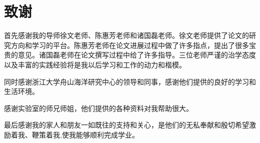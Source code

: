 \renewcommand{\baselinestretch}{1.5}
\fontsize{12pt}{13pt}\selectfont
{}
\chapter*{致谢}
首先感谢我的导师徐文老师、陈惠芳老师和诸国磊老师。徐文老师提供了论文的研究方向和学习的平台。陈惠芳老师在论文进展过程中做了许多指点，提出了很多宝贵的意见。诸国磊老师在论文撰写过程中给了许多指导。三位老师严谨的治学态度以及丰富的实践经验将是我以后学习和工作的动力和楷模。

同时感谢浙江大学舟山海洋研究中心的领导和同事，感谢他们提供的良好的学习和生活环境。

感谢实验室的师兄师姐，他们提供的各种资料对我帮助很大。

最后感谢我的家人和朋友一如既往的支持和关心，是他们的无私奉献和殷切希望激励着我、鞭策着我,使我能够顺利完成学业。
\clearpage
\endinput